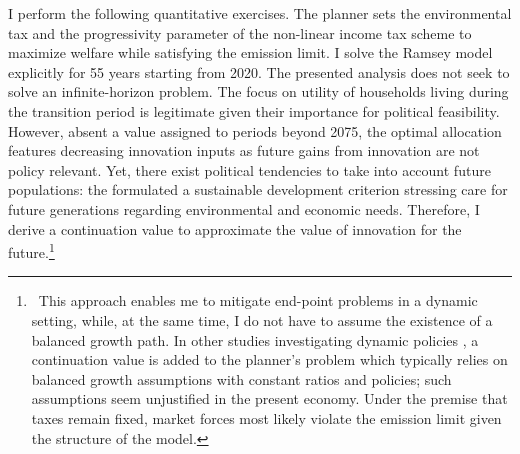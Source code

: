I perform the following quantitative exercises. 
 The planner sets the environmental tax and the progressivity parameter of the non-linear income tax scheme to maximize welfare while satisfying the emission limit. %
I solve the Ramsey model explicitly for 55 years starting from 2020. The presented analysis does not seek to solve an infinite-horizon problem. The focus on utility of households living during the transition period is legitimate given their importance for political feasibility.
However, absent a value assigned to periods beyond 2075, the optimal allocation features decreasing innovation inputs as future gains from innovation are not policy relevant.
Yet, there exist political tendencies to take into account future populations:  the \cite{UNSUS} formulated a sustainable development criterion stressing care for future generations regarding environmental and economic needs. 
Therefore, I derive a continuation value to approximate the value of innovation for the future.\footnote{\ This approach enables me to mitigate end-point problems in a dynamic setting, while, at the same time, I do not have to assume the existence of a balanced growth path. 
 In other studies investigating dynamic policies \citep{Jones1993OptimalGrowth, Barrage2019OptimalPolicy}, %
a continuation value is added to the planner's problem which typically relies on balanced growth assumptions with constant ratios and policies; such assumptions seem unjustified  in the present economy.
Under the premise that taxes remain fixed, market forces most likely violate the emission limit given the structure of the model. }

